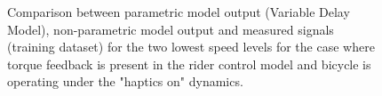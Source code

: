  

\begin{figure}[!h]
    \centering
    \begin{subfigure}[b]{\textwidth}
        \centering
        \caption{}
        \label{fig:dm_fit1}
    \end{subfigure}
    \begin{subfigure}[b]{\textwidth}
        \centering
        \caption{}
        \label{fig:dm_fit2}
    \end{subfigure}
    
    \caption{Comparison between parametric model output (Variable Delay Model), non-parametric model output and measured signals (training dataset) for the two lowest speed levels for the case where torque feedback is present in the rider control model and bicycle is operating under the "haptics on" dynamics.}
    \label{fig:dm_fitA}
 \end{figure}

